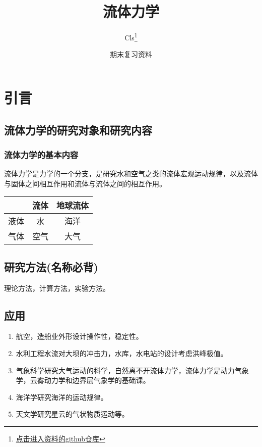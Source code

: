 \documentclass[a4paper,oneside]{ctexbook}
\title{流体力学}
\author{Cls\thanks{\href{https://github.com/Clignniis}{点击进入资料的github仓库}}}
\date{期末复习资料}
\begin{document}
\frontmatter 

\maketitle

\chapter*{引言}

\section*{流体力学的研究对象和研究内容}


\subsection*{流体力学的基本内容}

流体力学是力学的一个分支，是研究水和空气之类的流体宏观运动规律，以及流体与固体之间相互作用和流体与流体之间的相互作用。
\begin{center}
    \begin{tabular}{|c|c|c|}
        \hline
        &流体 & 地球流体\\
        \hline
        液体 & 水 & 海洋\\
        \hline
        气体 & 空气 & 大气\\
        \hline
    \end{tabular}
\end{center}

\section*{研究方法(名称必背)}

理论方法，计算方法，实验方法。

\section*{应用}
\begin{enumerate}
    \item 航空，造船业外形设计操作性，稳定性。
    \item 水利工程水流对大坝的冲击力，水库，水电站的设计考虑洪峰极值。
    \item 气象科学研究大气运动的科学，自然离不开流体力学，流体力学是动力气象学，云雾动力学和边界层气象学的基础课。
    \item 海洋学研究海洋的运动规律。
    \item 天文学研究星云的气状物质运动等。
\end{enumerate} 
\end{document}
